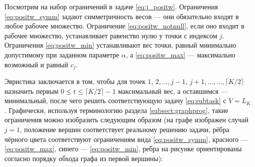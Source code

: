 \documentclass[10pt]{article}
\begin{document}
Посмотрим на набор ограничений в задаче \eqref{eq:j_positw}. Ограничения \eqref{eq:positw_symm} задают симметричность весов --- они обязательно входят в любое рабочее множество. Ограничение \eqref{eq:positw_notnull}, если оно входит в рабочее множество, устанавливает равенство нулю у точки с индексом $j$. Ограничения \eqref{eq:positw_min} устанавливают вес точки, равный минимально допустимому при заданном параметре $\alpha$, а \eqref{eq:positw_max} --- максимально возможный и равный $c_j$.

Эвристика заключается в том, чтобы для точек $1$, $2, \ldots, j-1$, $j + 1, \ldots, \ldots, \lceil K/2\rceil$ назначить первым $0 \le t \le \lceil K/2\rceil - 1$ максимальный вес, а оставшимся --- минимальный, после чего решить соответствующую задачу \eqref{eq:subtask} с $V = L_K$.  Графически, используя терминологию раздела \ref{subsect:graphprog}, такие ограничения можно изобразить следующим образом (на графе изображен случай $j = 1$, положение вершин соответствует реальному решению задачи, рёбра чёрного цвета соответствуют ограничениям вида \eqref{eq:positw_symm}, красного ---  \eqref{eq:positw_max}, синего --- \eqref{eq:positw_min}, ребра на рисунке ориентированы согласно порядку обхода графа из первой вершины):

\begin{center}
\end{center}
\end{document}
